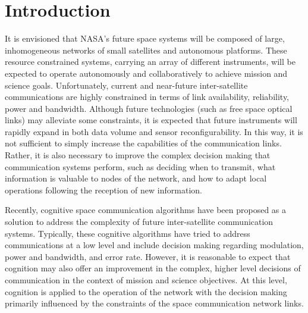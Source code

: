 \documentclass[conference]{IEEEtran}
\begin{document}
\section{Introduction}
\label{sec:intro}

It is envisioned that NASA's future space systems will be composed of large,
inhomogeneous networks of small satellites and autonomous platforms.  These
resource constrained systems, carrying an array of different instruments, will
be expected to operate autonomously and collaboratively to achieve mission and
science goals.  Unfortunately, current and near-future inter-satellite
communications are highly constrained in terms of link availability,
reliability, power and bandwidth.  Although future technologies (such as free
space optical links) may alleviate some constraints, it is expected that future
instruments will rapidly expand in both data volume and sensor
reconfigurability.  In this way, it is not sufficient to simply increase the
capabilities of the communication links.  Rather, it is also necessary to
improve the complex decision making that communication systems perform, such as
deciding when to transmit, what information is valuable to nodes of the network,
and how to adapt local operations following the reception of new information.

Recently, cognitive space communication algorithms have been proposed as a
solution to address the complexity of future inter-satellite communication
systems.  Typically, these cognitive algorithms have tried to address
communications at a low level and include decision making regarding modulation,
power and bandwidth, and error rate.  However, it is reasonable to expect that
cognition may also offer an improvement in the complex, higher level decisions
of communication in the context of mission and science objectives.  At this
level, cognition is applied to the operation of the network with the decision
making primarily influenced by the constraints of the space communication
network links.
\end{document}
